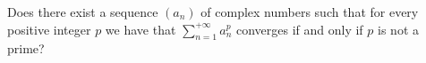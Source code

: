 Does there exist a sequence $\displaystyle{\left( {{a_n}} \right)}$ of complex numbers such that for every positive integer $\displaystyle{p}$ we have that $\displaystyle{\sum\limits_{n = 1}^{ + \infty } {a_n^p} }$ converges if and only if $\displaystyle{p}$ is not a prime?

